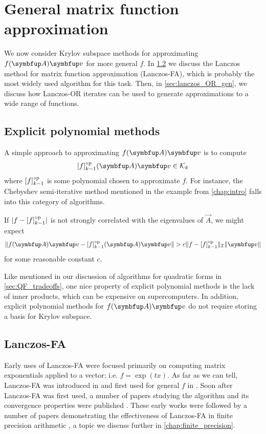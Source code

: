 \chapter{General matrix function approximation}
\label{chap:general_matfunc}

We now consider Krylov subspace methods for approximating \( \fA \vec{v} \) for more general \( f \).
In \cref{sec:lanczos_FA} we discuss the Lanczos method for matrix function approximation (Lanczos-FA), which is probably the most widely used algorithm for this task.
Then, in \cref{sec:lanczos_OR_gen}, we discuss how Lanczos-OR iterates can be used to generate approximations to a wide range of functions.


\section{Explicit polynomial methods}

A simple approach to approximating \( \fA\vec{v} \) is to compute 
\begin{equation*}
    \ff{f}{k-1}\mf{\vec{A}} \vec{v} \in \mathcal{K}_{k}
\end{equation*}
where \( \ff{f}{k-1} \) is some polynomial chosen to approximate \( f \).
For instance, the Chebyshev semi-iterative method mentioned in the example from \cref{chap:intro} falls into this category of algorithms.

If \( |f - \ff{f}{k-1}| \) is not strongly correlated with the eigenvalues of \( \vec{A} \), we might expect 
\begin{equation*}
    \| \fA \vec{v} - \ff{f}{k-1}\mf{\vec{A}} \vec{v} \|
    > c \| f - \ff{f}{k-1} \|_{\mathcal{I}} \| \vec{v} \|
\end{equation*}
for some reasonable constant \( c \).

Like mentioned in our discussion of algorithms for quadratic forms in \cref{sec:QF_tradeoffs}, one nice property of explicit polynomial methods is the lack of inner products, which can be expensive on supercomputers. 
In addition, explicit polynomial methods for \( \fA\vec{v} \) do not require storing a basis for Krylov subspace.

\section{Lanczos-FA}
\label{sec:lanczos_FA}

Early uses of Lanczos-FA were focused primarily on computing matrix exponentials applied to a vector; i.e. \( f = \exp(tx) \).
As far as we can tell, Lanczos-FA was introduced in \cite{nauts_wyatt_83} and first used for general \( f \) in \cite{vandervorst_87}.
Soon after Lanczos-FA was first used, a number of papers studying the algorithm and its convergence properties were published \cite{park_light_86,druskin_knizhnerman_88,druskin_knizhnerman_89,gallopoulos_saad_92,saad_92}.
These early works were followed by a number of papers demonstrating the effectiveness of Lanczos-FA in finite precision arithmetic \cite{druskin_knizhnerman_91,druskin_knizhnerman_95,druskin_greenbaum_knizhnerman_98}, a topic we discuss further in \cref{chap:finite_precision}.


